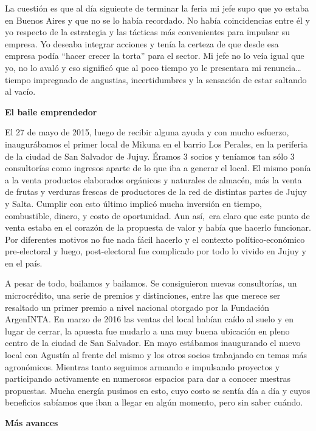 La cuestión es que al día siguiente de terminar la feria mi jefe supo
que yo estaba en Buenos Aires y que no se lo había recordado. No había
coincidencias entre él y yo respecto de la estrategia y las tácticas más
convenientes para impulsar su empresa. Yo deseaba integrar acciones y
tenía la certeza de que desde esa empresa podía ``hacer crecer la
torta'' para el sector. Mi jefe no lo veía igual que yo, no lo avaló y
eso significó que al poco tiempo yo le presentara mi renuncia\ldots{}
tiempo impregnado de angustias, incertidumbres y la sensación de estar
saltando al vacío.

\textbf{El baile emprendedor}

El 27 de mayo de 2015, luego de recibir alguna ayuda y con mucho
esfuerzo, inaugurábamos el primer local de Mikuna en el barrio Los
Perales, en la periferia de la ciudad de San Salvador de Jujuy. Éramos 3
socios y teníamos tan sólo 3 consultorías como ingresos aparte de lo que
iba a generar el local. El mismo ponía a la venta productos elaborados
orgánicos y naturales de almacén, más la venta de frutas y verduras
frescas de productores de la red de distintas partes de Jujuy y Salta.
Cumplir con esto último implicó mucha inversión en tiempo, combustible,
dinero, y costo de oportunidad. Aun así,~era claro que este punto de
venta estaba en el corazón de la propuesta de valor y había que hacerlo
funcionar. Por diferentes motivos no fue nada fácil hacerlo y el
contexto político-económico pre-electoral y luego, post-electoral fue
complicado por todo lo vivido en Jujuy y en el país.

A pesar de todo, bailamos y bailamos. Se consiguieron nuevas
consultorías, un microcrédito, una serie de premios y distinciones,
entre las que merece ser resaltado un primer premio a nivel nacional
otorgado por la Fundación ArgenINTA. En marzo de 2016 las ventas del
local habían caído al suelo y en lugar de cerrar, la apuesta fue mudarlo
a una muy buena ubicación en pleno centro de la ciudad de San Salvador.
En mayo estábamos inaugurando el nuevo local con Agustín al frente del
mismo y los otros socios trabajando en temas más agronómicos. Mientras
tanto seguimos armando e impulsando proyectos y participando activamente
en numerosos espacios para dar a conocer nuestras propuestas. Mucha
energía pusimos en esto, cuyo costo se sentía día a día y cuyos
beneficios sabíamos que iban a llegar en algún momento, pero sin saber
cuándo.

\textbf{Más avances}

